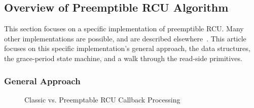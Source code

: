 \subsection{Overview of Preemptible RCU Algorithm}
\label{app:rcuimpl:Overview of Preemptible RCU Algorithm}

This section focuses on a specific implementation of preemptible RCU.
Many other implementations are possible, and are described
elsewhere~\cite{PaulEMcKenney2006b,PaulMcKenney05b}.
This article focuses on this specific implementation's
general approach, the data structures,
the grace-period state machine, and a walk through the read-side primitives.

\subsubsection{General Approach}
\label{app:rcuimpl:General Approach}

\begin{figure}[htb]
\begin{center}
\end{center}
\caption{Classic vs. Preemptable RCU Callback Processing}
\label{app:rcuimpl:Classic vs. Preemptable RCU Callback Processing}
\end{figure}

